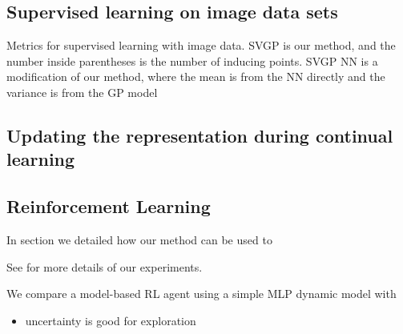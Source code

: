 \documentclass{article}
\newlength{\tblw}
\begin{document}
\subsection{Supervised learning on image data sets}

\begin{table}[t!] 
  \centering\scriptsize
  \caption{Metrics for supervised learning with image data. SVGP is our method, and the number inside parentheses is the number of inducing points. SVGP NN is a modification of our method, where the mean is from the NN directly and the variance is from the GP model} 
	\label{tbl:imagesuper}
	\renewcommand{\arraystretch}{1.}
	\setlength{\tabcolsep}{6pt}
	\setlength{\tblw}{0.2\textwidth}  
	
	\newcommand{\val}[2]{%
		$#1$\textcolor{gray}{\tiny ${\pm}#2$}
	} 

	
\end{table}
\subsection{Updating the representation during continual learning}

\begin{table}[t!] 
  \centering\scriptsize
  \caption{
  TODO: CL Experiments. $^*$ Methods relying only on weight regularization. 
  }
	\label{tbl:cl_table_1}
	\renewcommand{\arraystretch}{1.}
	\setlength{\tabcolsep}{2pt}
	\setlength{\tblw}{0.14\textwidth}  
	
	\newcommand{\val}[2]{%
		$#1$\textcolor{gray}{\tiny ${\pm}#2$}
	} 
	
	
\end{table}


\subsection{Reinforcement Learning}

In section \label{sec-rl} we detailed how our method can be used to

See \label{sec-rl-experiments-appendix} for more details of our experiments.



We compare a model-based RL agent using a simple MLP dynamic model with
\begin{itemize}
  \item uncertainty is good for exploration
\end{itemize}
\end{document}
